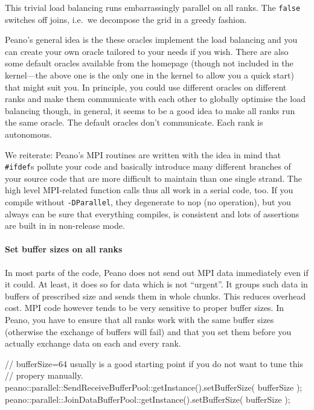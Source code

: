 \noindent
This trivial load balancing runs embarrassingly parallel on all ranks. 
The \texttt{false} switches off joins, i.e.~we decompose the grid in a greedy
fashion.

Peano's general idea is the these oracles implement the load balancing and you
can create your own oracle tailored to your needs if you wish.
There are also some default oracles available from the homepage (though not
included in the kernel---the above one is the only one in the kernel to allow
you a quick start) that might suit you.
In principle, you could use different oracles on different ranks and make them
communicate with each other to globally optimise the load balancing
though, in general, it seems to be a good idea to make all ranks 
run the same oracle.
The default oracles don't communicate. 
Each rank is autonomous.
 
\begin{remark}
We reiterate:
Peano's MPI routines are written with the idea in mind that \texttt{\#ifdef}s
pollute your code and basically introduce many different branches of your source
code that are more difficult to maintain than one single strand. The high level
MPI-related function calls thus all work in a serial code, too. If you
compile without \texttt{-DParallel}, they degenerate to nop (no operation), but
you always can be sure that everything compiles, is consistent and lots of
assertions are built in in non-release mode.
\end{remark}



\paragraph{Set buffer sizes on all ranks}
In most parts of the code, Peano does not send out MPI data immediately even 
if it could.
At least, it does so for data which is not ``urgent''.
It groups such data in buffers of prescribed size and sends them in whole
chunks.
This reduces overhead cost.
MPI code however tends to be very sensitive to proper buffer
sizes.
In Peano, you have to ensure that all ranks work with the same buffer sizes
(otherwise the exchange of buffers will fail) and that you set them before you
actually exchange data on each and every rank. 

\begin{code}
// bufferSize=64 usually is a good starting point if you do not want to tune this
// propery manually.
peano::parallel::SendReceiveBufferPool::getInstance().setBufferSize( bufferSize );
peano::parallel::JoinDataBufferPool::getInstance().setBufferSize( bufferSize );
\end{code}

